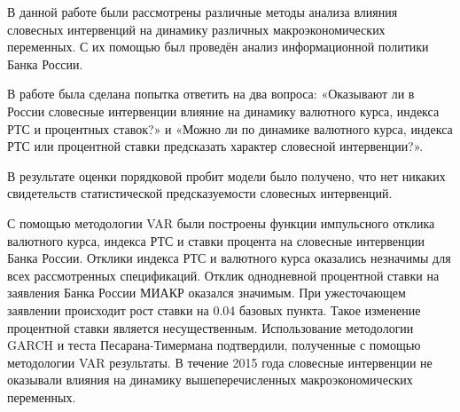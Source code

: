 В данной работе были рассмотрены различные методы анализа влияния словесных интервенций на динамику различных макроэкономических переменных. С их помощью был проведён анализ информационной политики Банка России.  

В работе была сделана попытка ответить на два вопроса: «Оказывают ли в России словесные интервенции влияние на динамику валютного курса, индекса РТС и процентных ставок?» и «Можно ли по динамике валютного курса, индекса РТС или процентной ставки предсказать характер словесной интервенции?». 

В результате оценки порядковой пробит модели было получено, что нет никаких свидетельств статистической предсказуемости словесных интервенций. 

С помощью методологии VAR были построены функции импульсного отклика валютного курса, индекса РТС и ставки процента на словесные интервенции Банка России. Отклики индекса РТС и валютного курса оказались незначимы для всех рассмотренных спецификаций. Отклик однодневной процентной ставки на заявления Банка России МИАКР оказался значимым. При ужесточающем заявлении происходит рост ставки на 0.04 базовых пункта. Такое изменение процентной ставки является несущественным. Использование методологии GARCH и теста Песарана-Тимермана подтвердили, полученные с помощью методологии VAR результаты. В течение 2015 года словесные интервенции не оказывали влияния на динамику вышеперечисленных макроэкономических переменных. 

\newpage



\renewcommand\bibname{Список литературы}

